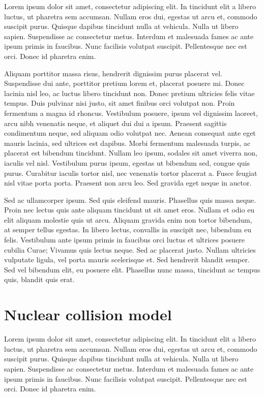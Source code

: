 \documentclass[aps,prc,reprint,amsmath,nofootinbib]{revtex4-1}
\begin{document}
 Lorem ipsum dolor sit amet, consectetur adipiscing elit. In tincidunt elit a libero luctus, ut pharetra sem accumsan. Nullam eros dui, egestas ut arcu et, commodo suscipit purus. Quisque dapibus tincidunt nulla at vehicula. Nulla ut libero sapien. Suspendisse ac consectetur metus. Interdum et malesuada fames ac ante ipsum primis in faucibus. Nunc facilisis volutpat suscipit. Pellentesque nec est orci. Donec id pharetra enim.

Aliquam porttitor massa risus, hendrerit dignissim purus placerat vel. Suspendisse dui ante, porttitor pretium lorem et, placerat posuere mi. Donec lacinia nisl leo, ac luctus libero tincidunt non. Donec pretium ultricies felis vitae tempus. Duis pulvinar nisi justo, sit amet finibus orci volutpat non. Proin fermentum a magna id rhoncus. Vestibulum posuere, ipsum vel dignissim laoreet, arcu nibh venenatis neque, et aliquet dui dui a ipsum. Praesent sagittis condimentum neque, sed aliquam odio volutpat nec. Aenean consequat ante eget mauris lacinia, sed ultrices est dapibus. Morbi fermentum malesuada turpis, ac placerat est bibendum tincidunt. Nullam leo ipsum, sodales sit amet viverra non, iaculis vel nisl. Vestibulum purus ipsum, egestas ut bibendum sed, congue quis purus. Curabitur iaculis tortor nisl, nec venenatis tortor placerat a. Fusce feugiat nisl vitae porta porta. Praesent non arcu leo. Sed gravida eget neque in auctor.

Sed ac ullamcorper ipsum. Sed quis eleifend mauris. Phasellus quis massa neque. Proin nec lectus quis ante aliquam tincidunt ut sit amet eros. Nullam et odio eu elit aliquam molestie quis ut arcu. Aliquam gravida enim non tortor bibendum, at semper tellus egestas. In libero lectus, convallis in suscipit nec, bibendum eu felis. Vestibulum ante ipsum primis in faucibus orci luctus et ultrices posuere cubilia Curae; Vivamus quis lectus neque. Sed ac placerat justo. Nullam ultricies vulputate ligula, vel porta mauris scelerisque et. Sed hendrerit blandit semper. Sed vel bibendum elit, eu posuere elit. Phasellus nunc massa, tincidunt ac tempus quis, blandit quis erat. 

\section{Nuclear collision model}

 Lorem ipsum dolor sit amet, consectetur adipiscing elit. In tincidunt elit a libero luctus, ut pharetra sem accumsan. Nullam eros dui, egestas ut arcu et, commodo suscipit purus. Quisque dapibus tincidunt nulla at vehicula. Nulla ut libero sapien. Suspendisse ac consectetur metus. Interdum et malesuada fames ac ante ipsum primis in faucibus. Nunc facilisis volutpat suscipit. Pellentesque nec est orci. Donec id pharetra enim.
\end{document}
